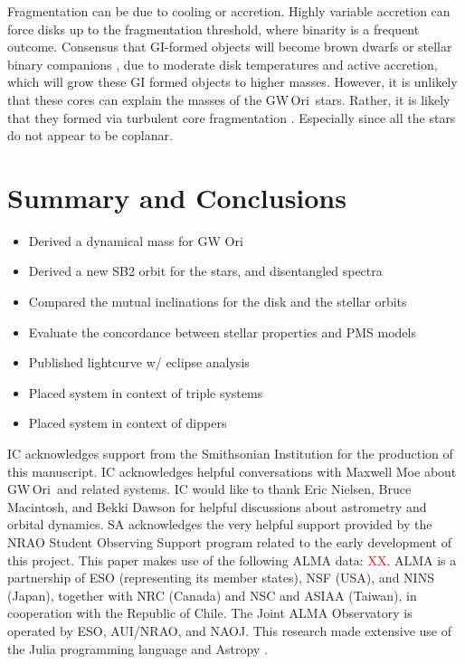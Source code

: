 \documentclass[twocolumn]{aastex61}
\newcommand{\todo}[1]{ \textcolor{red}{#1}}
\newcommand{\obj}{GW\,Ori}
\begin{document}
Fragmentation can be due to cooling or accretion. Highly variable accretion can force disks up to the fragmentation threshold, where binarity is a frequent outcome. Consensus that GI-formed objects will become brown dwarfs or stellar binary companions \citep{kratter10}, due to moderate disk temperatures and active accretion, which will grow these GI formed objects to higher masses. However, it is unlikely that these cores can explain the masses of the \obj\ stars. Rather, it is likely that they formed via turbulent core fragmentation \citep{offner10}. Especially since all the stars do not appear to be coplanar.






\section{Summary and Conclusions} \label{sec:summary}

\begin{itemize}
\item Derived a dynamical mass for GW Ori
\item Derived a new SB2 orbit for the stars, and disentangled spectra
\item Compared the mutual inclinations for the disk and the stellar orbits
\item Evaluate the concordance between stellar properties and PMS models
\item Published lightcurve w/ eclipse analysis
\item Placed system in context of triple systems
\item Placed system in context of dippers
\end{itemize}

\acknowledgments
IC acknowledges support from the Smithsonian Institution for the production of this manuscript. IC acknowledges helpful conversations with Maxwell Moe about \obj\ and related systems. IC would like to thank Eric Nielsen, Bruce Macintosh, and Bekki Dawson for helpful discussions about astrometry and orbital dynamics. SA acknowledges the very helpful support provided by the NRAO Student Observing Support program related to the early development of this project.  This paper makes use of the following ALMA data: \todo{XX}. ALMA is a partnership of ESO (representing its member states), NSF (USA), and NINS (Japan), together with NRC (Canada) and NSC and ASIAA (Taiwan), in cooperation with the Republic of Chile.  The Joint ALMA Observatory is operated by ESO, AUI/NRAO, and NAOJ.  This research made extensive use of the Julia programming language \citep{bezanson17} and Astropy \citep{astropy13}.




\end{document}

